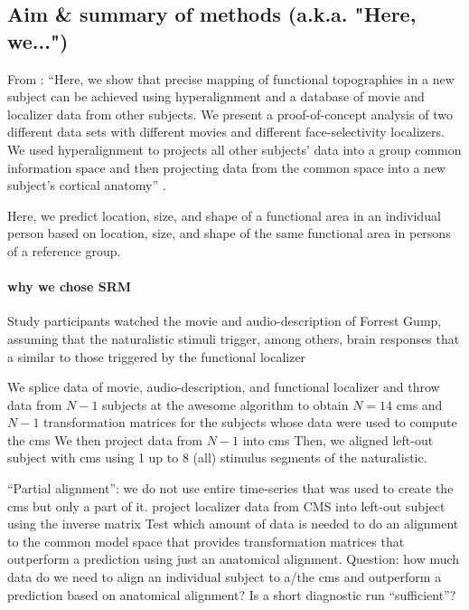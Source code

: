 \subsection{Aim \& summary of methods (a.k.a. "Here, we...")}

From \citet{jiahui2020predicting}: ``Here, we show that precise mapping of
functional topographies in a new subject can be achieved using hyperalignment
and a database of movie and localizer data from other subjects.
%
We present a proof-of-concept analysis of two different data sets with different
movies and different face-selectivity localizers.
%
We used hyperalignment to projects all other subjects' data into a group common
information space and then projecting data from the common space into a new
subject's cortical anatomy'' \citep{jiahui2020predicting}.


Here, we predict location, size, and shape of a functional area in an individual
person based on location, size, and shape of the same functional area in persons
of a reference group.

\paragraph{why we chose SRM}




Study participants watched the movie and audio-description of Forrest Gump,
assuming that the naturalistic stimuli trigger, among others, brain responses
that a similar to those triggered by the functional localizer

We splice data of movie, audio-description, and functional localizer and throw
data from $N-1$ subjects at the awesome algorithm to obtain $N=14$ \ac{cms} and
$N-1$ transformation matrices for the subjects whose data were used to compute
the \ac{cms}
%
We then project data from $N-1$ into \ac{cms}
%
Then, we aligned left-out subject with \ac{cms} using 1 up to 8 (all) stimulus
segments of the naturalistic.
%

%
``Partial alignment'': we do not use entire time-series that was used to create
the \ac{cms} but only a part of it.
%
project localizer data from CMS into left-out subject using the inverse matrix
%
Test which amount of data is needed to do an alignment to the common model space
that provides transformation matrices that outperform a prediction using just an
anatomical alignment.
%
Question: how much data do we need to align an individual subject to a/the
\ac{cms} and outperform a prediction based on anatomical alignment?
%
Is a short diagnostic run ``sufficient''?
%

